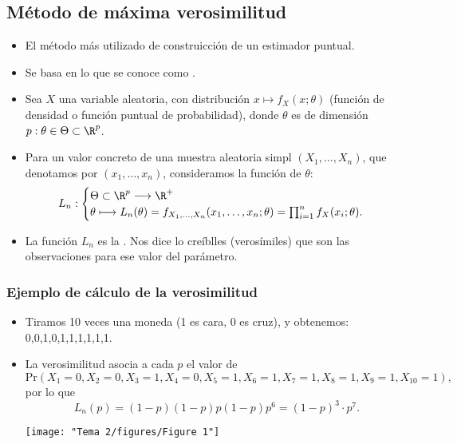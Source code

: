 \subsection{Método de máxima verosimilitud}
\begin{itemize}[label=\textbullet]
    \item El método más utilizado de construicción de un estimador puntual.
    \item Se basa en lo que se conoce como . 
\end{itemize}
\begin{tcolorbox}[colback=blue!5!white, colframe=blue!75!black, title=\textbf{Definición}]
\begin{itemize}[label=\textbullet]
    \item Sea $X$ una variable aleatoria, con distribución $x\longmapsto f_X(x;\theta)$ (función de densidad o función puntual de probabilidad), donde $\theta$ es de dimensión $p:\theta\in \Theta\subset \R^p$.
    \item Para un valor concreto de una muestra aleatoria simpl $(X_1,\dots,X_n)$, que denotamos por $(x_1,\dots,x_n)$, consideramos la función de $\theta$: \[
    L_n: \begin{cases}
        \Theta\subset \R^p\longrightarrow \R^+\\
        \theta\longmapsto L_n(\theta)=f_{X_1,\dots,X_n}(x_1,\dots,x_n;\theta)=\prod_{i=1}^{n} f_X(x_i;\theta). 
    \end{cases}
    \] 
\item La función $L_n$ es la  . Nos dice lo creíblles (verosímiles) que son las observaciones para ese valor del parámetro. 
\end{itemize}
\end{tcolorbox}

\subsubsection*{Ejemplo de cálculo de la verosimilitud}
\begin{itemize}[label=\textbullet]
    \item Tiramos 10 veces una moneda (1 es cara, 0 es cruz), y obtenemos: 0,0,1,0,1,1,1,1,1,1.
    \item La verosimilitud asocia a cada $p$ el valor de \[
    \mathrm{Pr}(X_1=0,X_2=0,X_3=1,X_4=0,X_5=1,X_6=1,X_7=1,X_8=1,X_9=1,X_{10}=1),
    \] 
    por lo que \[
    L_n(p)=(1-p)(1-p)p(1-p)p^6=(1-p)^3\cdot p^7.
    \] 
    \begin{center}
        \texttt{[image: "Tema 2/figures/Figure 1"]}
    \end{center}
\end{itemize}

